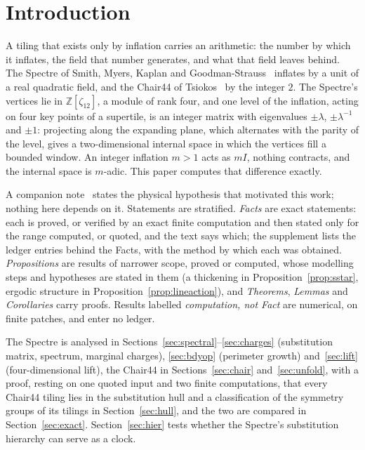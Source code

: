 \documentclass[11pt]{article}
\theoremstyle{definition}
\theoremstyle{remark}
\newcommand{\lam}{\lambda}
\begin{document}
\section{Introduction}
\label{sec:intro}

A tiling that exists only by inflation carries an arithmetic: the number by which it inflates, the field that number
generates, and what that field leaves behind.  The Spectre of Smith, Myers, Kaplan and Goodman-Strauss~\cite{SmithEtAl,SmithEtAl2}
inflates by a unit of a real quadratic field, and the Chair44 of Tsiokos~\cite{Tsiokos1} by the integer $2$.  The
Spectre's vertices lie in $\mathbb{Z}[\zeta_{12}]$, a module of rank four, and one level of the inflation, acting on four key points of a
supertile, is an integer matrix with eigenvalues $\pm\lam$, $\pm\lam^{-1}$ and $\pm1$: projecting along the expanding
plane, which alternates with the parity of the level, gives a two-dimensional internal space in which the vertices fill
a bounded window.  An integer inflation $m>1$ acts as $mI$, nothing contracts, and the internal space is $m$-adic.
This paper computes that difference exactly.

A companion note~\cite{BangNote} states the physical hypothesis that motivated this work; nothing here depends on it.
Statements are stratified.  \emph{Facts} are exact statements: each is proved, or verified by an exact finite computation
and then stated only for the range computed, or quoted, and the text says which; the supplement lists the ledger entries behind
the Facts, with the method by which each was obtained.  \emph{Propositions} are results of narrower scope, proved or computed, whose modelling steps and hypotheses are
stated in them (a thickening in Proposition~\ref{prop:sstar}, ergodic structure in Proposition~\ref{prop:lineaction}), and \emph{Theorems},
\emph{Lemmas} and \emph{Corollaries} carry proofs.  Results labelled \emph{computation, not Fact} are numerical, on finite
patches, and enter no ledger.

The Spectre is analysed in Sections~\ref{sec:spectral}--\ref{sec:charges} (substitution matrix, spectrum, marginal charges),
\ref{sec:bdyop} (perimeter growth) and~\ref{sec:lift} (four-dimensional lift), the Chair44 in Sections~\ref{sec:chair}
and~\ref{sec:unfold}, with a proof, resting on one quoted input and two finite computations, that every Chair44 tiling lies in the substitution hull
and a classification of the symmetry groups of its tilings in Section~\ref{sec:hull}, and the two are compared in Section~\ref{sec:exact}.  Section~\ref{sec:hier} tests whether the
Spectre's substitution hierarchy can serve as a clock.
\end{document}
